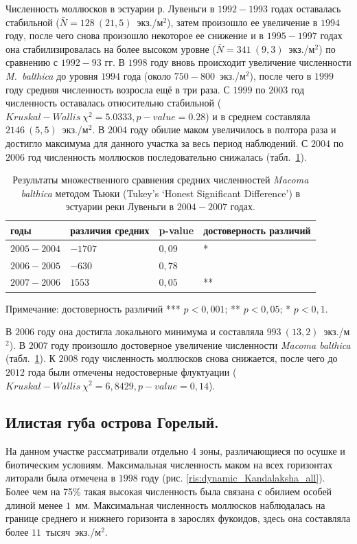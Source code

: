 \documentclass[12pt, a4paper]{disser}
\begin{document}
Численность моллюсков в эстуарии р. Лувеньги в $1992-1993$ годах оставалась стабильной ($\bar{N} = 128~(21,5)$~экз./м$^2$), затем произошло ее увеличение в $1994$ году, после чего снова произошло некоторое ее снижение и в $1995 - 1997$ годах она стабилизировалась на более высоком уровне ($\bar{N} = 341~(9,3)$~экз./м$^2$) по сравнению с $1992 - 93$ гг.
В $1998$ году вновь происходит увеличение численности {\it M.~balthica} до уровня $1994$ года (около $750 - 800$~экз./м$^2$), после чего в $1999$ году средняя численность возросла ещё в три раза.
С $1999$ по $2003$ год численность оставалась относительно стабильной  ($Kruskal-Wallis\ \chi^2 = 5.0333, p-value = 0.28$) и в среднем составляла $2146~(5,5)$~экз./м$^2$.
В $2004$ году обилие маком увеличилось в полтора раза и достигло максимума для данного участка за весь период наблюдений. 
С $2004$ по $2006$ год численность моллюсков последовательно снижалась (табл.~\ref {tab:Tukey_estuary_04_07_n2}). 
	\begin{table}
	\begin{tabular}{|*{4}{p{}|}} \hline
	годы & различия средних & p-value & достоверность различий\\
	\hline
	$2005-2004$ & $-1707$ & $0,09$ & *\\
	\hline
	$2006-2005$ & $-630$ & $0,78$ & \\
	\hline
	$2007-2006$ & $1553$ & $0,05$ & **\\
	\hline
	\end{tabular}

	{\footnotesize Примечание: достоверность различий *** \textemdash $p<0,001$; ** \textemdash $p<0,05$; * \textemdash $p<0,1$.}
	\caption{Результаты множественного сравнения средних численностей {\it Macoma balthica} методом Тьюки (Tukey's ‘Honest Significant Difference’) в эстуарии реки Лувеньги в $2004-2007$ годах.}
	\label{tab:Tukey_estuary_04_07_n2}
	\end{table}
В $2006$ году она достигла локального минимума и составляла $993~(13,2)$~экз./м$^2$). 
В $2007$ году произошло достоверное увеличение численности {\it Macoma balthica} (табл.~\ref {tab:Tukey_estuary_04_07_n2}).
К $2008$ году численность моллюсков снова снижается, после чего до $2012$ года были отмечены недостоверные флуктуации ($Kruskal-Wallis\ \chi^2 = 6,8429, p-value = 0,14$).

		\subsection{Илистая губа острова Горелый.}
На данном участке рассматривали отдельно 4 зоны, различающиеся по осушке и биотическим условиям. 
Максимальная численность маком на всех горизонтах литорали была отмечена в $1998$ году (рис. \ref{ris:dynamic_Kandalaksha_all}).
Более чем на 75\% такая высокая численность была связана с обилием особей длиной менее $1$~мм.
Максимальная численность моллюсков наблюдалась на границе среднего и нижнего горизонта в зарослях фукоидов, здесь она составляла более $11$~тысяч~экз./м$^2$.
\end{document}
